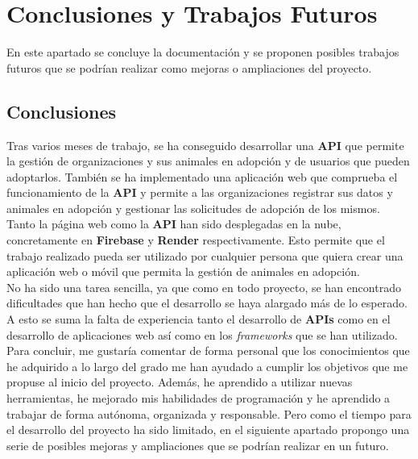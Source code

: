 \chapter{Conclusiones y Trabajos Futuros}\label{ch:conclusiones-y-trabajos-futuros}

En este apartado se concluye la documentación y se proponen posibles trabajos futuros que se podrían realizar como
mejoras o ampliaciones del proyecto.

\section{Conclusiones}\label{sec:conclusiones}

Tras varios meses de trabajo, se ha conseguido desarrollar una \textbf{API} que permite la gestión de organizaciones
y sus animales en adopción y de usuarios que pueden adoptarlos. También se ha implementado una aplicación web que
comprueba el funcionamiento de la \textbf{API} y permite a las organizaciones registrar sus datos y animales en adopción
y gestionar las solicitudes de adopción de los mismos. \\

Tanto la página web como la \textbf{API} han sido desplegadas en la nube, concretamente en \textbf{Firebase} y \textbf{Render}
respectivamente. Esto permite que el trabajo realizado pueda ser utilizado por cualquier persona que quiera crear una
aplicación web o móvil que permita la gestión de animales en adopción. \\

No ha sido una tarea sencilla, ya que como en todo proyecto, se han encontrado dificultades que han hecho que el desarrollo
se haya alargado más de lo esperado. A esto se suma la falta de experiencia tanto el desarrollo de \textbf{APIs} como en
el desarrollo de aplicaciones web así como en los \textit{frameworks} que se han utilizado. \\

Para concluir, me gustaría comentar de forma personal que los conocimientos que he
adquirido a lo largo del grado me han ayudado a cumplir los objetivos que me propuse al inicio del proyecto. Además, he
aprendido a utilizar nuevas herramientas, he mejorado mis habilidades de programación y he aprendido a trabajar de forma
autónoma, organizada y responsable. Pero como el tiempo para el desarrollo del proyecto ha sido limitado, en el siguiente
apartado propongo una serie de posibles mejoras y ampliaciones que se podrían realizar en un futuro.



